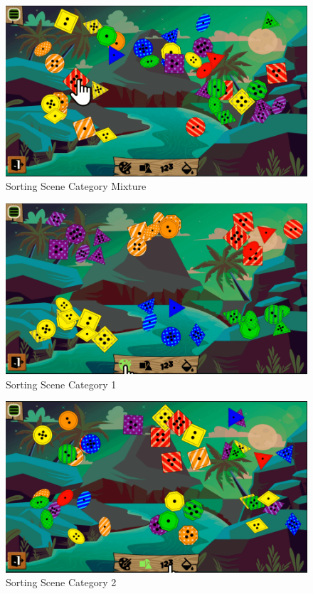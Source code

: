 \begin{figure}[H]
    \centering
    \includegraphics[width=1\textwidth]{figures/sortingscene1}
    \caption{Sorting Scene Category Mixture}
    \label{fig:sortingscene1}
\end{figure}

\begin{figure}[H]
    \centering
    \includegraphics[width=1\textwidth]{figures/sortingscene2}
    \caption{Sorting Scene Category 1}
    \label{fig:sortingscene2}
\end{figure}

\begin{figure}[H]
    \centering
    \includegraphics[width=1\textwidth]{figures/sortingscene3}
    \caption{Sorting Scene Category 2}
    \label{fig:sortingscene3}
\end{figure}

